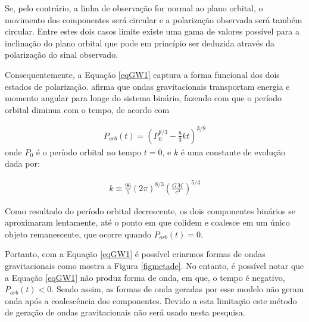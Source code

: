 Se, pelo contrário, a linha de observação for normal ao plano orbital, o movimento dos componentes será circular e a polarização observada será também circular. Entre estes dois casos limite existe uma gama de valores possível para a inclinação do plano orbital que pode em princípio ser deduzida através da polarização do sinal observado.

Consequentemente, a Equação \ref{eqGW1} captura a forma funcional dos dois estados de polarização. \cite{rubbo2007hands} afirma que ondas gravitacionais transportam energia e momento angular para longe do sistema binário, fazendo com que o período orbital diminua com o tempo, de acordo com

\begin{equation} \label{eqGW4}
\begin{split}
P_{orb}(t) = \left(P_0^{8/3} - \frac{8}{3}kt \right)^{3/8}
\end{split}
\end{equation}
onde $P_0$ é o período orbital no tempo $t = 0$, e $k$ é uma constante de evolução dada por:

\begin{equation} \label{eqGW5}
\begin{split}
k \equiv \frac{96}{5}(2\pi)^{8/3} \left(\frac{G\mathcal{M}}{c^3}\right)^{5/3}
\end{split}
\end{equation}

Como resultado do período orbital decrescente, os dois componentes binários se aproximaram lentamente, até o ponto em que colidem e coalesce em um único objeto remanescente, que ocorre quando $P_{orb}(t) = 0$.

Portanto, com a Equação \ref{eqGW1} é possível criarmos formas de ondas gravitacionais como mostra a Figura \ref{figmetade}. No entanto, é possível notar que a Equação \ref{eqGW1} não produz forma de onda, em que, o tempo é negativo, $P_{orb}(t) < 0$. Sendo assim, as formas de onda geradas por esse modelo não geram onda após a coalescência dos componentes. Devido a esta limitação este método de geração de ondas gravitacionais não será usado nesta pesquisa.

